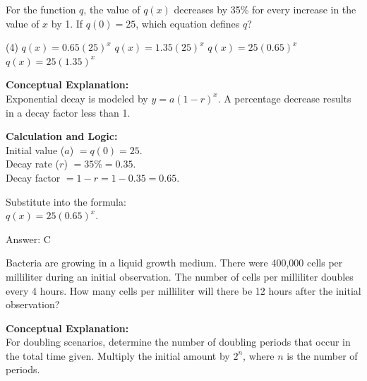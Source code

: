\documentclass[11pt,paper=a4,answers]{exam}
\begin{document}
\begin{questions}
\question
For the function $q$, the value of $q(x)$ decreases by 35\% for every increase in the value of $x$ by 1. If $q(0) = 25$, which equation defines $q$?
\begin{tasks}(4)
    \task $q(x) = 0.65(25)^x$
    \task $q(x) = 1.35(25)^x$
    \task $q(x) = 25(0.65)^x$
    \task $q(x) = 25(1.35)^x$
\end{tasks}

\begin{solution}
\textbf{Conceptual Explanation:} \\
Exponential decay is modeled by $y = a(1 - r)^x$. A percentage decrease results in a decay factor less than 1.

\vspace{20pt}

\textbf{Calculation and Logic:} \\
Initial value ($a$) $= q(0) = 25$. \\
Decay rate ($r$) $= 35\% = 0.35$. \\
Decay factor $= 1 - r = 1 - 0.35 = 0.65$.

\vspace{10pt}

Substitute into the formula: \\
$q(x) = 25(0.65)^x$.

\vspace{25pt}

Answer: \colorbox{yellow!100}{C}
\end{solution}

\vspace{40pt}

\question
Bacteria are growing in a liquid growth medium. There were 400,000 cells per milliliter during an initial observation. The number of cells per milliliter doubles every 4 hours. How many cells per milliliter will there be 12 hours after the initial observation?

\begin{solution}
\textbf{Conceptual Explanation:} \\
For doubling scenarios, determine the number of doubling periods that occur in the total time given. Multiply the initial amount by $2^n$, where $n$ is the number of periods.

\vspace{20pt}


\end{solution}
\end{questions}
\end{document}
